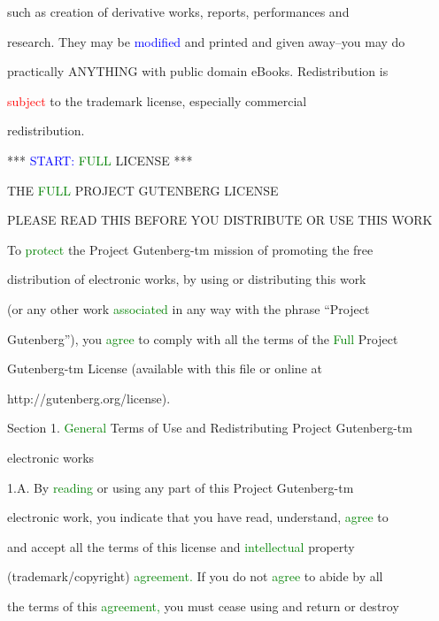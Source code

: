  such as creation of derivative works, reports, performances and

 research. They may be \textcolor{blue}{modified} and printed and given away--you may do

 practically ANYTHING with \textcolor{BurntOrange}{public} domain eBooks. Redistribution is

 \textcolor{red}{subject} to the trademark license, especially commercial

 redistribution.







 *** \textcolor{blue}{START:} \textcolor{green}{FULL} LICENSE ***



 THE \textcolor{green}{FULL} PROJECT GUTENBERG LICENSE

 PLEASE READ THIS BEFORE YOU DISTRIBUTE OR USE THIS WORK



 To \textcolor{green}{protect} the Project Gutenberg-tm mission of promoting the free

 distribution of electronic works, by using or distributing this work

 (or any other work \textcolor{green}{associated} in any way with the phrase “Project

 Gutenberg”), you \textcolor{green}{agree} to comply with all the terms of the \textcolor{green}{Full} Project

 Gutenberg-tm License (available with this file or online at

 http://gutenberg.org/license).





 Section 1. \textcolor{green}{General} Terms of Use and Redistributing Project Gutenberg-tm

 electronic works



 1.A. By \textcolor{green}{reading} or using any part of this Project Gutenberg-tm

 electronic work, you indicate that you have read, understand, \textcolor{green}{agree} to

 and accept all the terms of this license and \textcolor{green}{intellectual} property

 (trademark/copyright) \textcolor{green}{agreement.} If you do not \textcolor{green}{agree} to abide by all

 the terms of this \textcolor{green}{agreement,} you must cease using and return or destroy

